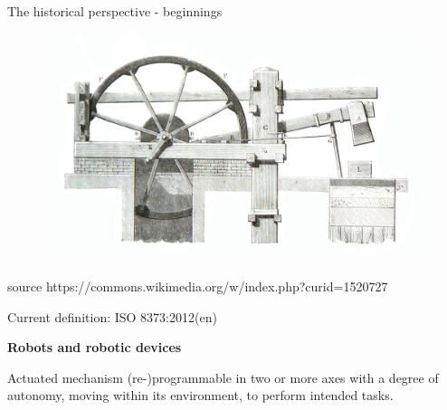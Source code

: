 \documentclass[usenames,dvipsnames,xcolor=table]{beamer}
\begin{document}

\begin{frame}{The historical perspective - beginnings}
\begin{center}
\begin{figure}
\includegraphics[width=0.8\linewidth]{blacksmith.jpg}
\end{figure}

{\small source https://commons.wikimedia.org/w/index.php?curid=1520727}

\end{center}
\end{frame}


\begin{frame}{Current definition: ISO 8373:2012(en)}
\begin{center}
\textbf{\large  Robots and robotic devices\\[4pt]}

Actuated mechanism (re-)programmable in two or more axes with a degree of autonomy, moving within its environment, to perform intended tasks.

\end{center}
\end{frame}

\end{document}
